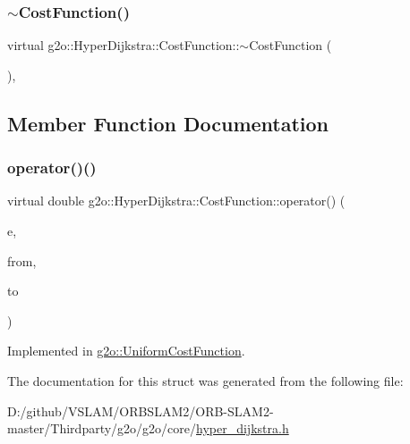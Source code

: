 \subsubsection{\texorpdfstring{$\sim$\+Cost\+Function()}{~CostFunction()}}
{\footnotesize\ttfamily virtual g2o\+::\+Hyper\+Dijkstra\+::\+Cost\+Function\+::$\sim$\+Cost\+Function (\begin{DoxyParamCaption}{ }\end{DoxyParamCaption})\hspace{0.3cm}{\ttfamily [inline]}, {\ttfamily [virtual]}}



\subsection{Member Function Documentation}
\mbox{\label{structg2o_1_1_hyper_dijkstra_1_1_cost_function_a6d30ca80400c75941851ae079cfd42fd}} 
\subsubsection{\texorpdfstring{operator()()}{operator()()}}
{\footnotesize\ttfamily virtual double g2o\+::\+Hyper\+Dijkstra\+::\+Cost\+Function\+::operator() (\begin{DoxyParamCaption}\item[{\mbox{\hyperlink{classg2o_1_1_hyper_graph_1_1_edge}{Hyper\+Graph\+::\+Edge}} $\ast$}]{e,  }\item[{\mbox{\hyperlink{classg2o_1_1_hyper_graph_1_1_vertex}{Hyper\+Graph\+::\+Vertex}} $\ast$}]{from,  }\item[{\mbox{\hyperlink{classg2o_1_1_hyper_graph_1_1_vertex}{Hyper\+Graph\+::\+Vertex}} $\ast$}]{to }\end{DoxyParamCaption})\hspace{0.3cm}{\ttfamily [pure virtual]}}



Implemented in \mbox{\hyperlink{structg2o_1_1_uniform_cost_function_a44e15e4af4310890d4c7965cb6c7aaad}{g2o\+::\+Uniform\+Cost\+Function}}.



The documentation for this struct was generated from the following file\+:\begin{DoxyCompactItemize}
\item 
D\+:/github/\+V\+S\+L\+A\+M/\+O\+R\+B\+S\+L\+A\+M2/\+O\+R\+B-\/\+S\+L\+A\+M2-\/master/\+Thirdparty/g2o/g2o/core/\mbox{\hyperlink{hyper__dijkstra_8h}{hyper\+\_\+dijkstra.\+h}}\end{DoxyCompactItemize}

